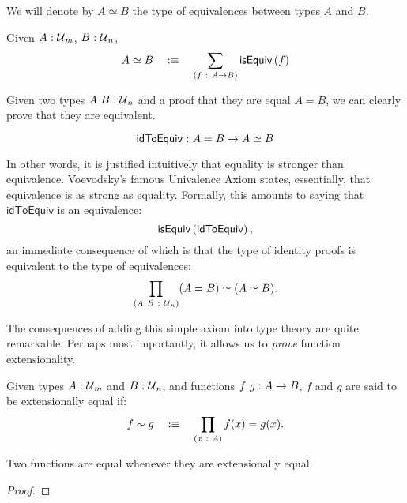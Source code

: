 We will denote by $A \simeq B$ the type of equivalences between types $A$ and $B$.
\begin{defn}
  Given $A\hspace{0.1mm}:\hspace{0.1mm}\mathcal{U}{}_m$, $B\hspace{0.1mm}:\hspace{0.1mm}\mathcal{U}{}_n$,
  \begin{equation*}
    A \simeq B \quad:\equiv\quad \sum_{(f~:~A \rightarrow B)} \mathsf{isEquiv}\left(f\right)
  \end{equation*}
\end{defn}

Given two types $A~B\hspace{0.1mm}:\hspace{0.1mm}\mathcal{U}{}_n$ and a proof that they are equal
$A = B$, we can clearly prove that they are equivalent.
\begin{defn}
  \begin{equation*}
    \mathsf{idToEquiv}\hspace{0.1mm}:\hspace{0.1mm}A = B \rightarrow A \simeq B
  \end{equation*}
\end{defn}
In other words, it is justified intuitively that equality is stronger than equivalence.
Voevodsky's famous Univalence Axiom states, essentially, that equivalence is as strong as
equality. Formally, this amounts to saying that $\mathsf{idToEquiv}$ is an equivalence:
\begin{equation*}
  \mathsf{isEquiv}\left(\mathsf{idToEquiv}{}\right),
\end{equation*}
an immediate consequence of which is that the type of identity proofs is equivalent to the
type of equivalences:
\begin{equation*}
  \prod_{(A~B~:~\mathcal{U}{}_n)} (A = B) \simeq (A \simeq B).
\end{equation*}

The consequences of adding this simple axiom into type theory are quite remarkable.
Perhaps most importantly, it allows us to \emph{prove} function extensionality.
\begin{defn}\label{defn:exteq}
  Given types $A\hspace{0.1mm}:\hspace{0.1mm}\mathcal{U}{}_m$ and $B\hspace{0.1mm}:\hspace{0.1mm}\mathcal{U}{}_n$, and functions
  $f~g:A \rightarrow B$, $f$ and $g$ are said to be extensionally equal if:
  \begin{equation*}
    f \sim g \quad:\equiv\quad \prod_{(x~:~A)} f(x) = g(x).
  \end{equation*}
\end{defn}

\begin{prop}\label{prop:funext}
  Two functions are equal whenever they are extensionally equal.
\end{prop}
\begin{proof}
\end{proof}

